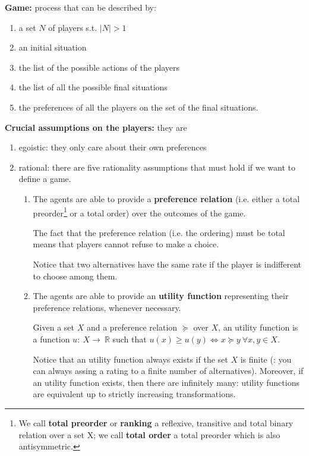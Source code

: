 \documentclass[pt11,a4paper,twoside,reqno,openright]{paper}
\begin{document}
\noindent \textbf{Game:} process that can be described by:
\begin{enumerate}
	\item a set $N$ of players s.t. $|N| > 1$
	\item an initial situation
	\item the list of the possible actions of the players
	\item the list of all the possible final situations
	\item the preferences of all the players on the set of the final 
	situations.
\end{enumerate}

\noindent \textbf{Crucial assumptions on the players:} they are
\begin{enumerate}
	\item egoistic: they only care about their own preferences
	\item rational: there are five rationality assumptions that must hold if 
	we want to define a game.
	\begin{enumerate}
		\item The agents are able to provide a \textbf{preference relation} 
		(i.e. either a total preorder\footnote{We call \textbf{total preorder} 
		or \textbf{ranking} a reflexive, transitive and total binary relation 
		over a set X; we call \textbf{total order} a total preorder which is 
		also antisymmetric.} 
		or a total order) over the outcomes of the game.

		\noindent The fact that the preference relation (i.e. the ordering) 
		must be total means that players cannot refuse to make a choice.

		\noindent Notice that two alternatives have the same rate if the player 
		is indifferent to choose among them.

		\item The agents are able to provide an \textbf{utility function} 
		representing their preference relations, whenever necessary.

		\noindent Given a set $X$ and a preference relation $\succeq$ over $X$, 
		an utility function is a function $u:~X\rightarrow~\mathbb{R}$ 
		such that $u(x) \geq u(y) \iff x \succeq y ~\forall x,y \in X$.

		\noindent Notice that an utility function always exists if the set $X$ 
		is finite (: you can always assing a rating to a finite number of 
		alternatives). Moreover, if an utility function exists, then there are 
		infinitely many: utility functions are equivalent up to strictly 
		increasing transformations.


\end{enumerate}
\end{enumerate}
\end{document}
